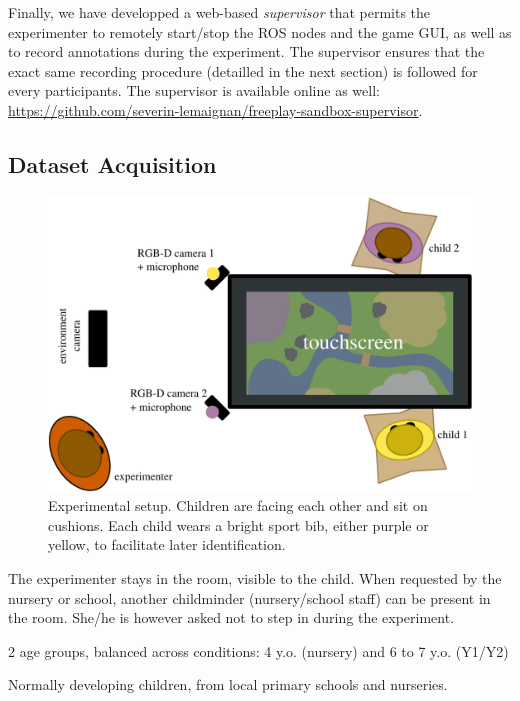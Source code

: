 \documentclass{article}
\begin{document}
Finally, we have developped a web-based \emph{supervisor} that permits the
experimenter to remotely start/stop the ROS nodes and the game GUI, as well as to
record annotations during the experiment. The supervisor ensures that the exact
same recording procedure (detailled in the next section) is followed for every
participants. The supervisor is available online as well:
\url{https://github.com/severin-lemaignan/freeplay-sandbox-supervisor}.

\subsection{Dataset Acquisition}

\begin{figure}[htbp]
    \centering
    \includegraphics[width=0.8\linewidth]{setup_child_child_top}
    \caption{Experimental setup. Children are facing each other and sit on
    cushions. Each child wears a bright sport bib, either purple or yellow, to
    facilitate later identification.}
    \label{fig|setup}
\end{figure}

The experimenter stays in the room, visible to the child. When
requested by the nursery or school, another childminder (nursery/school
staff) can be present in the room. She/he is however asked not to step
in during the experiment.


2 age groups, balanced across conditions: 4 y.o. (nursery) and 6 to 7
y.o. (Y1/Y2)

Normally developing children, from local primary schools and nurseries.
\end{document}
